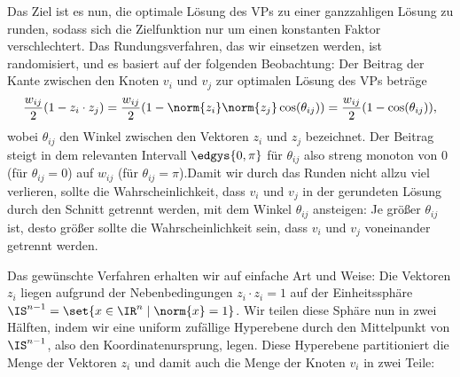 \documentclass[language=ngerman,algolist]{TemplateLecture}
\begin{document}
Das Ziel ist es nun, die optimale Lösung des VPs zu einer ganzzahligen Lösung zu runden, sodass sich die Zielfunktion nur um einen konstanten Faktor verschlechtert. Das Rundungsverfahren, das wir einsetzen werden, ist randomisiert, und es basiert auf der folgenden Beobachtung: Der Beitrag der Kante zwischen den Knoten $v_i$ und $v_j$ zur optimalen Lösung des VPs beträge 
\begin{equation*}
    \frac{w_{ij}}{2}(1 - z_i \cdot z_j) = \frac{w_{ij}}{2}(1 - \norm{z_i} \norm{z_j} \cos(\theta_{ij})) = \frac{w_{ij}}{2}(1 - \cos(\theta_{ij})),
\end{equation*}
wobei $\theta_{ij}$ den Winkel zwischen den Vektoren $z_i$ und $z_j$ bezeichnet. Der Beitrag steigt in dem relevanten Intervall $\edgys{0, \pi}$ für $\theta_{ij}$ also streng monoton von $0$ (für $\theta_{ij} = 0$) auf $w_{ij}$ (für $\theta_{ij} = \pi$).Damit wir durch das Runden nicht allzu viel verlieren, sollte die Wahrscheinlichkeit, dass $v_i$ und $v_j$ in der gerundeten Lösung durch den Schnitt getrennt werden, mit dem Winkel $\theta_{ij}$ ansteigen: Je größer $\theta_{ij}$ ist, desto größer sollte die Wahrscheinlichkeit sein, dass $v_i$ und $v_j$ voneinander getrennt werden.

Das gewünschte Verfahren erhalten wir auf einfache Art und Weise: Die Vektoren $z_i$ liegen aufgrund der Nebenbedingungen $z_i \cdot z_i = 1$ auf der Einheitssphäre $\IS^{n-1} = \set{x \in \IR^n \mid \norm{x} = 1}$. Wir teilen diese Sphäre nun in zwei Hälften, indem wir eine uniform zufällige Hyperebene durch den Mittelpunkt von $\IS^{n-1}$, also den Koordinatenursprung, legen. Diese Hyperebene partitioniert die Menge der Vektoren $z_i$ und damit auch die Menge der Knoten $v_i$ in zwei Teile:

\begin{algorithm}[h]
    \caption{\textsc{SDPMaxCut}}\label{alg:SDPMaxCut}
    \begin{algorithmic}[1]
    \end{algorithmic}
\end{algorithm}
\end{document}
